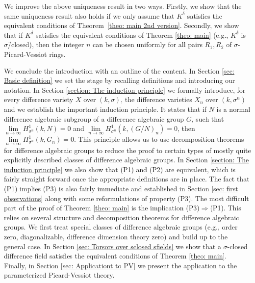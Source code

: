 \documentclass[oneside,reqno]{amsart}
\theoremstyle{definition}
\newcommand{\s}{\sigma}
\newcommand{\de}{\delta}
\newcommand{\poweak}{{\rm{(P1)}}}
\newcommand{\ptweak}{{\rm{(P3)}}}
\newcommand{\pwweak}{{\rm{(P2)}}}
\begin{document}
We improve the above uniqueness result in two ways. Firstly, we show that the same uniqueness result also holds if we only assume that $K^\de$ satisfies the equivalent conditions of Theorem~\ref{theo: main 2nd version}. Secondly, we show that if $K^\de$ satisfies the equivalent conditions of Theorem \ref{theo: main} (e.g., $K^\de$ is $\s$\=/closed), then the integer $n$ can be chosen uniformly for all pairs $R_1,R_2$ of $\s$-Picard-Vessiot rings.



\medskip


We conclude the introduction with an outline of the content. In Section \ref{sec: Basic definition} we set the stage by recalling definitions and introducing our notation. In Section \ref{section: The induction principle} we formally introduce, for every difference variety $X$ over $(k,\s)$, the difference varieties $X_n$ over $(k,\s^n)$ and we establish the important induction principle. It states that if $N$ is a normal difference algebraic subgroup of a difference algebraic group $G$, such that $\lim\limits_{n\to \infty} H^1_{\s^n}(k,N)=0$ and $\lim\limits_{n\to \infty} H^1_{\s^n}(k,(G/N)_n)=0$, then $\lim\limits_{n\to \infty} H^1_{\s^n}(k,G_n)=0$. This principle allows us to use decomposition theorems for difference algebraic groups to reduce the proof to certain types of mostly quite explicitly described classes of difference algebraic groups. In Section \ref{section: The induction principle} we also show that \poweak{} and \pwweak{} are equivalent, which is fairly straight forward once the appropriate definitions are in place. The fact that \poweak{} implies \ptweak{} is also fairly immediate and established in Section \ref{sec: first observations} along with some reformulations of property \ptweak{}.
The most difficult part of the proof of Theorem \ref{theo: main} is the implication \ptweak{}$\Rightarrow$\poweak{}. This relies on several structure and decomposition theorems for difference algebraic groups. We first treat special classes of difference algebraic groups (e.g., order zero, diagonalizable, difference dimension theory zero) and build up to the general case. In Section \ref{sec: Torsors over sclosed sfields} we show that a $\s$-closed difference field satisfies the equivalent conditions of Theorem \ref{theo: main}. Finally, in Section \ref{sec: Applicationt to PV} we present the application to the parameterized Picard-Vessiot theory.



\medskip
\end{document}
